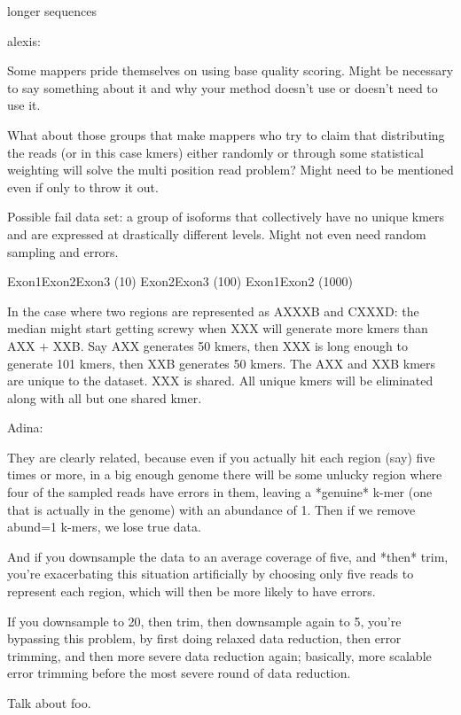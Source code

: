 \documentclass[10pt]{article}
\begin{document}
longer sequences

alexis:

Some mappers pride themselves on using base quality scoring.  Might be
necessary to say something about it and why your method doesn't use or
doesn't need to use it.

What about those groups that make mappers who try to claim that
distributing the reads (or in this case kmers) either randomly or
through some statistical weighting will solve the multi position read
problem?  Might need to be mentioned even if only to throw it out.

Possible fail data set: a group of isoforms that collectively have no
unique kmers and are expressed at drastically different levels.  Might
not even need random sampling and errors.

Exon1Exon2Exon3 (10)
Exon2Exon3                (100)
Exon1Exon2             (1000)

In the case where two regions are represented as AXXXB and CXXXD: the
median might start getting screwy when XXX will generate more kmers
than AXX + XXB.  Say AXX generates 50 kmers, then XXX is long enough
to generate 101 kmers, then XXB generates 50 kmers.  The AXX and XXB
kmers are unique to the dataset.  XXX is shared.  All unique kmers
will be eliminated along with all but one shared kmer.

Adina:

They are clearly related, because even if you actually hit each region
(say) five times or more, in a big enough genome there will be some
unlucky region where four of the sampled reads have errors in them,
leaving a *genuine* k-mer (one that is actually in the genome) with an
abundance of 1. Then if we remove abund=1 k-mers, we lose true data.

And if you downsample the data to an average coverage of five, and
*then* trim, you're exacerbating this situation artificially by
choosing only five reads to represent each region, which will then be
more likely to have errors.

If you downsample to 20, then trim, then
downsample again to 5, you're bypassing this problem, by first doing
relaxed data reduction, then error trimming, and then more severe data
reduction again; basically, more scalable error trimming before the
most severe round of data reduction.

Talk about foo.

\end{document}

